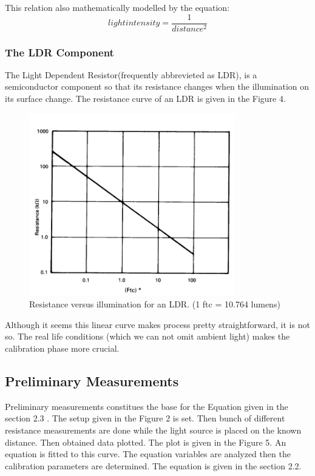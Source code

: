 \documentclass[letterpaper,12pt]{article}
\begin{document}
This relation also mathematically modelled by the equation:
\[light intensity  = \frac{1}{distance^2}\]
\subsubsection{The LDR Component}
The Light Dependent Resistor(frequently abbrevieted as LDR), is a semiconductor component so that its  resistance changes when the illumination on its surface change. The resistance curve of an LDR is given in the Figure 4.
\begin{figure}[H]
	\centering
   \includegraphics[width=0.8\textwidth]{resistance-illum.png}
   \caption{Resistance versus illumination for an LDR. (1 ftc = 10.764 lumens)}
\end{figure} 
Although it seems this linear curve makes process pretty straightforward, it is not so. The real life conditions (which we can not omit ambient light) makes the calibration phase more crucial.
\subsection{Preliminary Measurements}
Preliminary measurements constitues the base for the Equation given in the  section 2.3 . The setup given in the Figure 2 is set. Then bunch of different resistance measurements are done while the light source is placed on the known distance. Then obtained data plotted. The plot is given in the Figure 5.
An equation is fitted to this curve. The equation variables are analyzed then the calibration parameters are determined. The equation is given in the section 2.2. 
\end{document}
